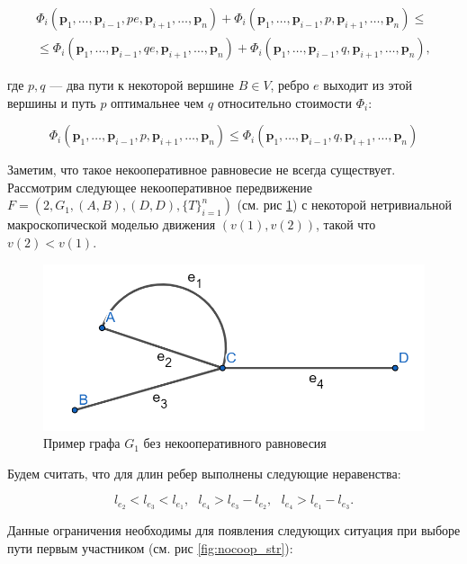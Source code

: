 \documentclass[12pt, a4paper]{article}
\begin{document}
\begin{align*}
	\Phi_i (\textbf{p}_1, \ldots, \textbf{p}_{i - 1}, pe, \textbf{p}_{i + 1}, \ldots, \textbf{p}_n) + 
	\Phi_i (\textbf{p}_1, \ldots, \textbf{p}_{i - 1}, p, \textbf{p}_{i + 1}, \ldots, \textbf{p}_n) \le \\ \le
	\Phi_i (\textbf{p}_1, \ldots, \textbf{p}_{i - 1}, qe, \textbf{p}_{i + 1}, \ldots, \textbf{p}_n) +
	\Phi_i (\textbf{p}_1, \ldots, \textbf{p}_{i - 1}, q, \textbf{p}_{i + 1}, \ldots, \textbf{p}_n),
\end{align*}

где $p, q$ --- два пути к некоторой вершине $B \in V$, ребро $e$ выходит из этой вершины и путь $p$ оптимальнее чем $q$ относительно стоимости $\Phi_i$:

$$\Phi_i (\textbf{p}_1, \ldots, \textbf{p}_{i - 1}, p, \textbf{p}_{i + 1}, \ldots, \textbf{p}_n) \le
  \Phi_i (\textbf{p}_1, \ldots, \textbf{p}_{i - 1}, q, \textbf{p}_{i + 1}, \ldots, \textbf{p}_n)$$

Заметим, что такое некооперативное равновесие не всегда существует. Рассмотрим следующее некооперативное передвижение $F = (2, G_1, (A, B), (D, D), \{T\}_{i = 1}^{n})$ (см. рис \ref{fig:nocoop}) с некоторой нетривиальной макроскопической моделью движения $(v(1), v(2))$, такой что $v(2) < v(1)$.

\begin{figure}[hpt]
	\includegraphics[scale = 0.3]{imgs/graph_nocoop.png}
	\centering
	\caption{Пример графа $G_1$ без некооперативного равновесия}
	\label{fig:nocoop}
\end{figure}

Будем считать, что для длин ребер выполнены следующие неравенства:

$$ l_{e_2} < l_{e_3} < l_{e_1}, \text{ } l_{e_4} > l_{e_3} - l_{e_2}, \text{ } l_{e_4} > l_{e_1} - l_{e_3}. $$

Данные ограничения необходимы для появления следующих ситуация при выборе пути первым участником (см. рис \ref{fig:nocoop_str}):
\end{document}
